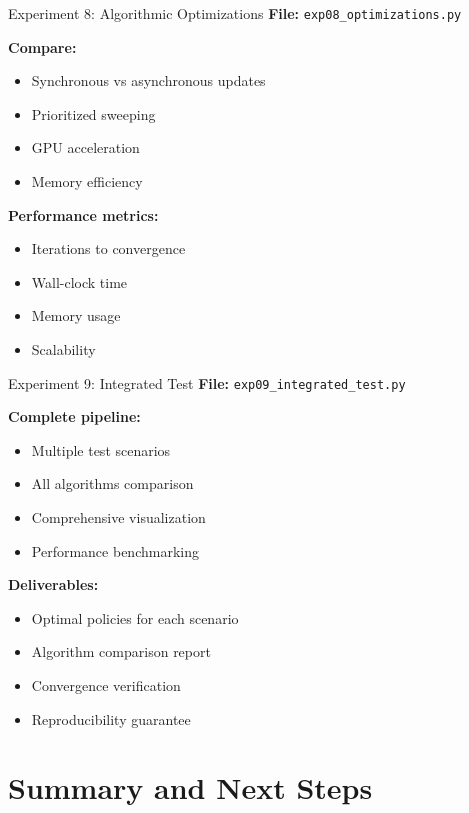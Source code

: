 \documentclass[aspectratio=169,10pt]{beamer}
\begin{document}
\begin{frame}{Experiment 8: Algorithmic Optimizations}
\textbf{File:} \texttt{exp08\_optimizations.py}

\textbf{Compare:}
\begin{itemize}
    \item Synchronous vs asynchronous updates
    \item Prioritized sweeping
    \item GPU acceleration
    \item Memory efficiency
\end{itemize}

\textbf{Performance metrics:}
\begin{itemize}
    \item Iterations to convergence
    \item Wall-clock time
    \item Memory usage
    \item Scalability
\end{itemize}
\end{frame}

\begin{frame}{Experiment 9: Integrated Test}
\textbf{File:} \texttt{exp09\_integrated\_test.py}

\textbf{Complete pipeline:}
\begin{itemize}
    \item Multiple test scenarios
    \item All algorithms comparison
    \item Comprehensive visualization
    \item Performance benchmarking
\end{itemize}

\textbf{Deliverables:}
\begin{itemize}
    \item Optimal policies for each scenario
    \item Algorithm comparison report
    \item Convergence verification
    \item Reproducibility guarantee
\end{itemize}
\end{frame}



\section{Summary and Next Steps}
\end{document}
